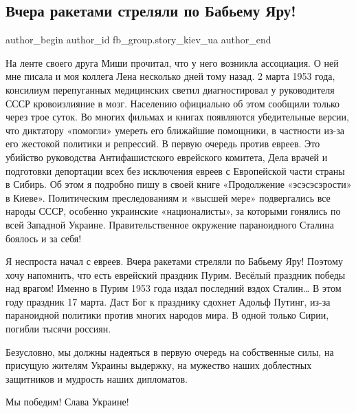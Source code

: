  
 
 
 
 
 
\subsection{Вчера ракетами стреляли по Бабьему Яру!}
\label{sec:02_02_2022.fb.fb_group.story_kiev_ua.2.babij_jar}
 
\ifcmt
 author_begin
   author_id fb_group.story_kiev_ua
 author_end
\fi


На ленте своего друга Миши прочитал, что у него возникла ассоциация. О ней мне
писала и моя коллега Лена несколько дней тому назад. 2 марта 1953 года,
консилиум перепуганных медицинских светил диагностировал у руководителя СССР
кровоизлияние в мозг. Населению официально об этом сообщили только через трое
суток. Во многих фильмах и книгах появляются убедительные версии, что диктатору
«помогли» умереть его ближайшие помощники, в частности из-за его жестокой
политики и репрессий. В первую очередь против евреев. Это убийство руководства
Антифашистского еврейского комитета, Дела врачей и подготовки депортации всех
без исключения евреев с Европейской части страны в Сибирь. Об этом я подробно
пишу в своей книге «Продолжение «эсэсэсэрости» в Киеве». Политическим
преследованиям и «высшей мере» подвергались все народы СССР, особенно
украинские «националисты», за которыми гонялись по всей Западной Украине.
Правительственное окружение параноидного Сталина боялось и за себя!

Я неспроста начал с евреев. Вчера ракетами стреляли по Бабьему Яру! Поэтому
хочу напомнить, что есть еврейский праздник Пурим. Весёлый праздник победы над
врагом! Именно в Пурим 1953 года издал последний вздох Сталин… В этом году
праздник 17 марта. Даст Бог к празднику сдохнет Адольф Путинг, из-за
параноидной политики против многих народов мира. В одной только Сирии, погибли
тысячи россиян.

Безусловно, мы должны надеяться в первую очередь на собственные силы, на
присущую жителям Украины выдержку, на мужество наших доблестных защитников и
мудрость наших дипломатов.

Мы победим! Слава Украине!
